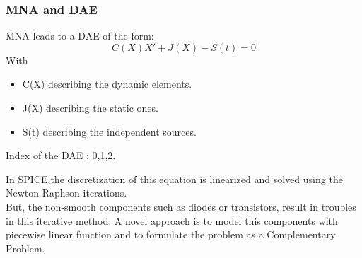 
\frame
{
\frametitle{MNA and DAE}
 \begin{block}{MNA leads to a DAE of the form:}
\[C(X)X'+J(X)-S(t)=0\]
With
\begin{itemize}
\item C(X) describing the dynamic elements.
\item J(X) describing the static ones.
\item S(t) describing the independent sources.
\end{itemize}
Index of the DAE : 0,1,2.
  \end{block}
In SPICE,the discretization of this equation is linearized and solved using the Newton-Raphson
  iterations.\\
  But, the non-smooth components such as diodes or transistors, result in troubles in this iterative
  method. A novel approach is to model this components with piecewise linear function and to
  formulate the problem as a Complementary Problem.
}
